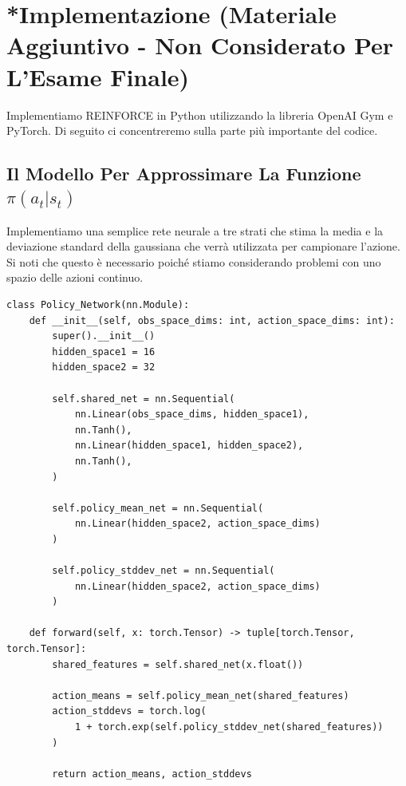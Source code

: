﻿\documentclass[11pt, a4paper]{report}
\begin{document}
\newpage

\begin{algorithm}[H]
\caption{REINFORCE}
\label{alg:reinforce}
\;
\;
\end{algorithm}

\section{*Implementazione (Materiale Aggiuntivo - Non Considerato Per L'Esame Finale)}

Implementiamo REINFORCE in Python utilizzando la libreria OpenAI Gym e PyTorch. Di seguito ci concentreremo sulla parte più importante del codice.

\subsection{Il Modello Per Approssimare La Funzione \texorpdfstring{$\pi(a_t|s_t)$}{pi(at|st)}}

Implementiamo una semplice rete neurale a tre strati che stima la media e la deviazione standard della gaussiana che verrà utilizzata per campionare l'azione. Si noti che questo è necessario poiché stiamo considerando problemi con uno spazio delle azioni continuo.

\begin{verbatim}
class Policy_Network(nn.Module):
    def __init__(self, obs_space_dims: int, action_space_dims: int):
        super().__init__()
        hidden_space1 = 16
        hidden_space2 = 32

        self.shared_net = nn.Sequential(
            nn.Linear(obs_space_dims, hidden_space1),
            nn.Tanh(),
            nn.Linear(hidden_space1, hidden_space2),
            nn.Tanh(),
        )

        self.policy_mean_net = nn.Sequential(
            nn.Linear(hidden_space2, action_space_dims)
        )

        self.policy_stddev_net = nn.Sequential(
            nn.Linear(hidden_space2, action_space_dims)
        )

    def forward(self, x: torch.Tensor) -> tuple[torch.Tensor, torch.Tensor]:
        shared_features = self.shared_net(x.float())

        action_means = self.policy_mean_net(shared_features)
        action_stddevs = torch.log(
            1 + torch.exp(self.policy_stddev_net(shared_features))
        )

        return action_means, action_stddevs
\end{verbatim}
\end{document}
